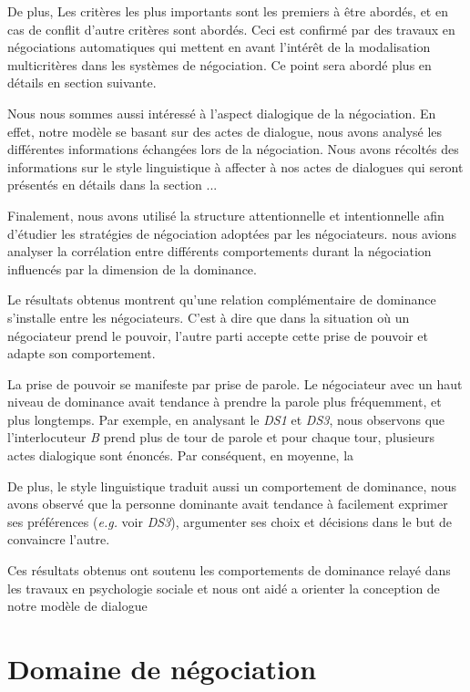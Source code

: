 			De plus, Les critères les plus importants sont les premiers à être abordés, et en cas de conflit d'autre critères sont abordés. 
			Ceci est confirmé par des travaux en négociations automatiques qui mettent en avant l'intérêt de la modalisation multicritères dans les systèmes de négociation. Ce point sera abordé plus en détails en section suivante. 
			 
			 Nous nous sommes aussi intéressé à l'aspect dialogique de la négociation. En effet, notre modèle se basant sur des actes de dialogue, nous avons analysé  les différentes informations échangées lors de la négociation. 
			 Nous avons récoltés des informations sur le style linguistique à affecter à nos actes de dialogues qui seront présentés en détails dans la section ... 
			 
			 Finalement, nous avons utilisé la structure attentionnelle et intentionnelle afin d'étudier les stratégies de négociation adoptées par les négociateurs. nous avions analyser la corrélation entre différents comportements durant la négociation influencés par la dimension de la dominance.
			 
			 Le résultats obtenus montrent qu'une relation complémentaire de dominance s'installe entre les négociateurs. C'est à dire que dans la situation où un négociateur prend le pouvoir, l'autre parti accepte cette prise de pouvoir et adapte son comportement.
		
			 La prise de pouvoir se manifeste par prise de parole. Le négociateur avec un haut niveau de dominance avait tendance à prendre la parole plus fréquemment, et plus longtemps. Par exemple, en analysant le \emph{DS1} et \emph{DS3}, nous observons que l'interlocuteur \textit{B} prend plus de tour de parole et pour chaque tour, plusieurs actes dialogique sont énoncés. Par conséquent, en moyenne, la
			 
			 
			 De plus, le style linguistique traduit aussi un comportement de dominance, nous avons observé que la personne dominante avait tendance à facilement exprimer ses préférences (\emph{e.g.} voir \emph{DS3}), argumenter ses choix et décisions dans le but de convaincre l'autre. 
			 
			Ces résultats obtenus ont soutenu les comportements de dominance relayé dans les travaux en psychologie sociale et nous ont aidé a orienter la conception de notre modèle de dialogue
			
		
	
	\section{Domaine de négociation}
	\label{domaine}
	
